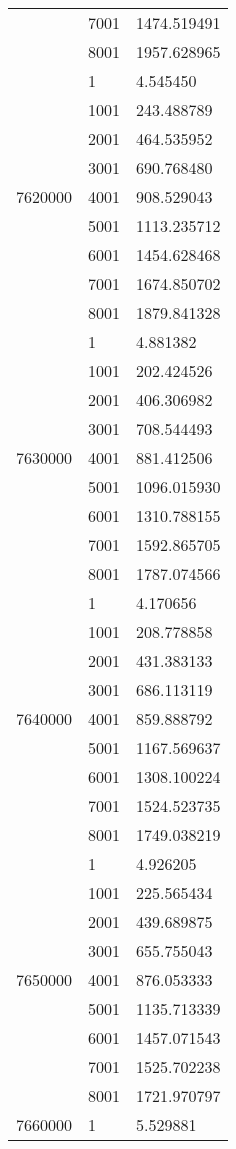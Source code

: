 \begin{table}[htb!]
\begin{tabular}{lll}
 & 7001 & 1474.519491 \\
 & 8001 & 1957.628965 \\
\multirow[c]{9}{*}{7620000} & 1 & 4.545450 \\
 & 1001 & 243.488789 \\
 & 2001 & 464.535952 \\
 & 3001 & 690.768480 \\
 & 4001 & 908.529043 \\
 & 5001 & 1113.235712 \\
 & 6001 & 1454.628468 \\
 & 7001 & 1674.850702 \\
 & 8001 & 1879.841328 \\
\multirow[c]{9}{*}{7630000} & 1 & 4.881382 \\
 & 1001 & 202.424526 \\
 & 2001 & 406.306982 \\
 & 3001 & 708.544493 \\
 & 4001 & 881.412506 \\
 & 5001 & 1096.015930 \\
 & 6001 & 1310.788155 \\
 & 7001 & 1592.865705 \\
 & 8001 & 1787.074566 \\
\multirow[c]{9}{*}{7640000} & 1 & 4.170656 \\
 & 1001 & 208.778858 \\
 & 2001 & 431.383133 \\
 & 3001 & 686.113119 \\
 & 4001 & 859.888792 \\
 & 5001 & 1167.569637 \\
 & 6001 & 1308.100224 \\
 & 7001 & 1524.523735 \\
 & 8001 & 1749.038219 \\
\multirow[c]{9}{*}{7650000} & 1 & 4.926205 \\
 & 1001 & 225.565434 \\
 & 2001 & 439.689875 \\
 & 3001 & 655.755043 \\
 & 4001 & 876.053333 \\
 & 5001 & 1135.713339 \\
 & 6001 & 1457.071543 \\
 & 7001 & 1525.702238 \\
 & 8001 & 1721.970797 \\
\multirow[c]{9}{*}{7660000} & 1 & 5.529881 \\

\end{tabular}
\end{table}
